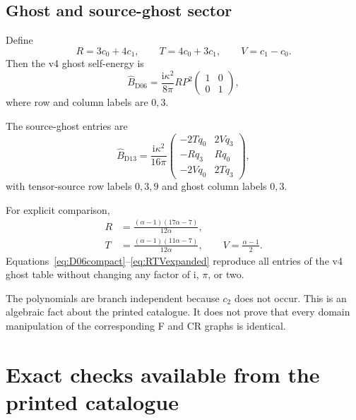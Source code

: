 \documentclass[11pt,a4paper]{article}
\newcommand{\ka}{\kappa}
\newcommand{\ii}{\mathrm i}
\theoremstyle{plain}
\theoremstyle{definition}
\theoremstyle{remark}
\numberwithin{equation}{section}
\begin{document}
\subsection{Ghost and source-ghost sector}

Define
\begin{equation}
R=3c_0+4c_1,\qquad
T=4c_0+3c_1,\qquad
V=c_1-c_0.
\label{eq:RTV}
\end{equation}
Then the v4 ghost self-energy is
\begin{equation}
\widehat B_{\mathrm{D06}}
 =\frac{\ii\ka^2}{8\pi}R P^2
 \begin{pmatrix}1&0\\0&1\end{pmatrix},
\label{eq:D06compact}
\end{equation}
where row and column labels are \(0,3\).

The source-ghost entries are
\begin{equation}
\widehat B_{\mathrm{D13}}
 =\frac{\ii\ka^2}{16\pi}
 \begin{pmatrix}
 -2Tq_0 & 2Vq_3\\
 -Rq_3 & Rq_0\\
 -2Vq_0 & 2Tq_3
 \end{pmatrix},
\label{eq:D13compact}
\end{equation}
with tensor-source row labels \(0,3,9\) and ghost column labels
\(0,3\).

For explicit comparison,
\begin{align}
R&=\frac{(\alpha-1)(17\alpha-7)}{12\alpha},\nonumber\\
T&=\frac{(\alpha-1)(11\alpha-7)}{12\alpha},\qquad
V=\frac{\alpha-1}{2}.
\label{eq:RTVexpanded}
\end{align}
Equations~\eqref{eq:D06compact}--\eqref{eq:RTVexpanded} reproduce
all entries of the v4 ghost table without changing any factor
of \(\ii\), \(\pi\), or two.

The polynomials are branch independent because \(c_2\) does not
occur. This is an algebraic fact about the printed catalogue.
It does not prove that every domain manipulation of the corresponding
F and CR graphs is identical.

\section{Exact checks available from the printed catalogue}
\label{sec:checks}
\end{document}
